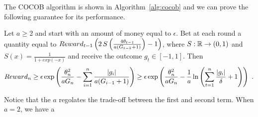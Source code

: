 The \ac{COCOB} algorithm is shown in Algorithm~\ref{alg:cocob} and we can prove the following guarantee for its performance.
%
\begin{theorem}
\label{theo:cocob}
Let $a\geq2$ and start with an amount of money equal to $\epsilon$. Bet at each round a quantity equal to
$Reward_{t-1} \left(2 \, S\left(\frac{4 \theta_{t-1}}{a (G_{t-1} + 1)}\right)-1\right)$, where $S:\mathbb{R}\rightarrow(0,1)$ and $S(x)=\frac{1}{1+exp(-x)}$ and receive the outcome $g_t \in [-1,1]$. Then
\begin{align*}
Reward_{n} 
\geq \epsilon \exp\left(\frac{\theta_{n}^2}{a G_{n}} - \sum_{i=1}^{n} \frac{|g_i|}{a( G_{i-1} + 1) } \right)
\geq \epsilon \exp\left(\frac{\theta_{n}^2}{a G_{n}} - \frac{1}{a} \ln \left(\sum_{t=1}^n \frac{|g_i|}{\delta}+1\right) \right)~.
\end{align*}
\end{theorem}
%
Notice that the $a$ regolates the trade-off between the first and second term. When $a=2$, we have a 